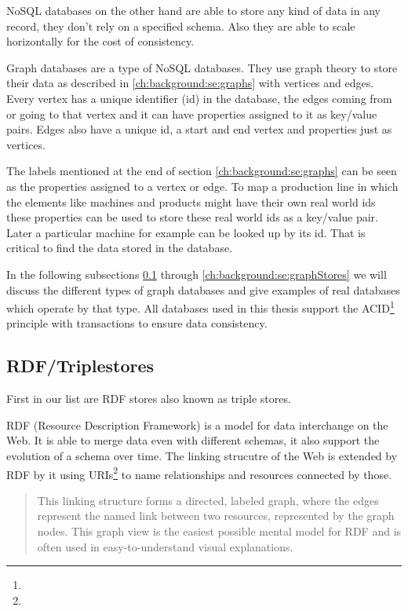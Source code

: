 NoSQL databases on the other hand are able to store any kind of data in any record,
they don't rely on a specified schema.
Also they are able to scale horizontally for the cost of consistency. \cite{Yegulalp2017}

Graph databases are a type of NoSQL databases.
They use graph theory to store their data as described in \ref{ch:background:se:graphs} with vertices and edges.
Every vertex has a unique identifier (id) in the database,
the edges coming from or going to that vertex and it can have properties assigned to it as key/value pairs.
Edges also have a unique id,
a start and end vertex and properties just as vertices. \cite{Rouse2016}

The labels mentioned at the end of section \ref{ch:background:se:graphs} can be seen as the properties assigned to a vertex or edge.
To map a production line in which the elements like machines and products might have their own real world ids these properties can be used to store these real world ids as a key/value pair.
Later a particular machine for example can be looked up by its id.
That is critical to find the data stored in the database.

In the following subsections \ref{ch:background:se:rdfTriplestores} through \ref{ch:background:se:graphStores} we will discuss the different types of graph databases and give examples of real databases which operate by that type.
All databases used in this thesis support the ACID\footnote{} principle with transactions to ensure data consistency.

\subsection{RDF/Triplestores}
\label{ch:background:se:rdfTriplestores}
First in our list are RDF stores also known as triple stores.

RDF (Resource Description Framework) is a model for data interchange on the Web.
It is able to merge data even with different schemas, it also support the evolution of a schema over time.
The linking strucutre of the Web is extended by RDF by it using URIs\footnote{} to name relationships and resources connected by those. \cite[4]{Ontotext2014}

\blockquote[\cite{W3C2014}]{This linking structure forms a directed, labeled graph, where the edges represent the named link between two resources, represented by the graph nodes.
This graph view is the easiest possible mental model for RDF and is often used in easy-to-understand visual explanations.}

